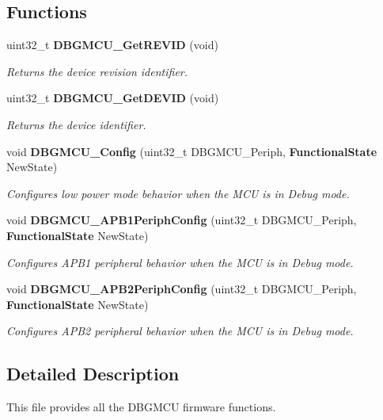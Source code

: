 \subsection*{Functions}
\begin{DoxyCompactItemize}
\item 
uint32\+\_\+t \textbf{ D\+B\+G\+M\+C\+U\+\_\+\+Get\+R\+E\+V\+ID} (void)
\begin{DoxyCompactList}\small\item\em Returns the device revision identifier. \end{DoxyCompactList}\item 
uint32\+\_\+t \textbf{ D\+B\+G\+M\+C\+U\+\_\+\+Get\+D\+E\+V\+ID} (void)
\begin{DoxyCompactList}\small\item\em Returns the device identifier. \end{DoxyCompactList}\item 
void \textbf{ D\+B\+G\+M\+C\+U\+\_\+\+Config} (uint32\+\_\+t D\+B\+G\+M\+C\+U\+\_\+\+Periph, \textbf{ Functional\+State} New\+State)
\begin{DoxyCompactList}\small\item\em Configures low power mode behavior when the M\+CU is in Debug mode. \end{DoxyCompactList}\item 
void \textbf{ D\+B\+G\+M\+C\+U\+\_\+\+A\+P\+B1\+Periph\+Config} (uint32\+\_\+t D\+B\+G\+M\+C\+U\+\_\+\+Periph, \textbf{ Functional\+State} New\+State)
\begin{DoxyCompactList}\small\item\em Configures A\+P\+B1 peripheral behavior when the M\+CU is in Debug mode. \end{DoxyCompactList}\item 
void \textbf{ D\+B\+G\+M\+C\+U\+\_\+\+A\+P\+B2\+Periph\+Config} (uint32\+\_\+t D\+B\+G\+M\+C\+U\+\_\+\+Periph, \textbf{ Functional\+State} New\+State)
\begin{DoxyCompactList}\small\item\em Configures A\+P\+B2 peripheral behavior when the M\+CU is in Debug mode. \end{DoxyCompactList}\end{DoxyCompactItemize}


\subsection{Detailed Description}
This file provides all the D\+B\+G\+M\+CU firmware functions. 


